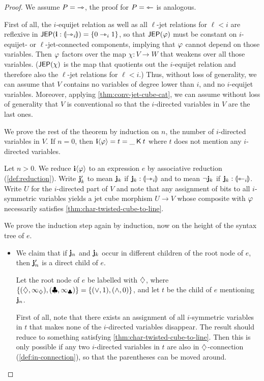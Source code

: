 \documentclass[a4paper]{memoir}
\begin{document}
\begin{proof}
	We assume $P = {\rightarrowtriangle}$, the proof for $P = {\leftarrowtriangle}$ is analogous.

	First of all, the $i$-equijet relation as well as all $\ell$-jet relations for $\ell < i$ are reflexive in $\mathsf{JEP}(\mathbf{i} : {\llparenthesis \rightarrowtriangle_i \rrparenthesis}) = \mathopen{}\left\{ 0 \rightarrowtriangle_i 1 \right\}\mathclose{}$, so that $\mathsf{JEP}(\varphi)$ must be constant on $i$-equijet- or $\ell$-jet-connected components, implying that $\varphi$ cannot depend on those variables.
	Then $\varphi$ factors over the map $\chi : V \to W$ that weakens over all those variables.
	($\mathsf{JEP}(\chi)$ is the map that quotients out the $i$-equijet relation and therefore also the $\ell$-jet relations for $\ell < i$.)
	Thus, without loss of generality, we can assume that $V$ contains no variables of degree lower than $i$, and no $i$-equijet variables.
	Moreover, applying \cref{thm:conv-jet-cube-cat}, we can assume without loss of generality that $V$ is conventional so that the $i$-directed variables in $V$ are the last ones.
	
	We prove the rest of the theorem by induction on $n$, the number of $i$-directed variables in $V$.
	If $n = 0$, then $\mathbf{i} \langle \varphi \rangle = t = \_ \mathbin{\mathsf{K}} t$ where $t$ does not mention any $i$-directed variables.
	
	Let $n > 0$.
	We reduce $\mathbf{i} \langle \varphi \rangle$ to an expression $e$ by associative reduction (\cref{def:reduction}).
	Write $\mathbf{j}_k'$ to mean $\mathbf{j}_k$ if $\mathbf{j}_k : {\llparenthesis \rightarrowtriangle_i \rrparenthesis}$ and to mean $\lnot \mathbf{j}_k$ if $\mathbf{j}_k : {\llparenthesis \leftarrowtriangle_i \rrparenthesis}$.
	Write $U$ for the $i$-directed part of $V$ and note that any assignment of bits to all $i$-symmetric variables yields a jet cube morphism $U \to V$ whose composite with $\varphi$ necessarily satisfies \cref{thm:char-twisted-cube-to-line}.
	
	We prove the induction step again by induction, now on the height of the syntax tree of $e$. 
	
	\begin{itemize}
		\item We claim that if $\mathbf{j}_n$ and $\mathbf{j}_{k}$ occur in different children of the root node of $e$, then $\mathbf{j}'_n$ is a direct child of $e$.
		
		Let the root node of $e$ be labelled with $\mathbin{\diamondsuit}$, where $\mathopen{}\left\{ (\mathbin{\diamondsuit}, \infty_{\mathbin{\diamondsuit}}), (\mathbin{\clubsuit}, \infty_{\mathbin{\clubsuit}}) \right\}\mathclose{} = \mathopen{}\left\{ (\vee, 1), (\wedge, 0) \right\}\mathclose{}$, and let $t$ be the child of $e$ mentioning $\mathbf{j}_n$.
		
		First of all, note that there exists an assignment of all $i$-symmetric variables in $t$ that makes none of the $i$-directed variables disappear.
		The result should reduce to something satisfying \cref{thm:char-twisted-cube-to-line}.
		Then this is only possible if any two $i$-directed variables in $t$ are also in $\mathbin{\diamondsuit}$-connection (\cref{def:in-connection}), so that the parentheses can be moved around. 
		

\end{itemize}
\end{proof}
\end{document}
